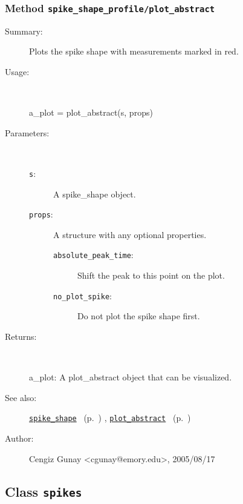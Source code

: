 \subsubsection[Method \texttt{plot\_abstract}]{Method \texttt{spike\_shape\_profile/plot\_abstract}}%
%
\label{ref_spike_shape_profile__plot_abstract}%
\hypertarget{ref_spike_shape_profile__plot_abstract}{}%
\begin{description}
\item[Summary:]Plots the spike shape with measurements marked in red.
%
\item[Usage:]~%
\begin{lyxcode}%
a\_plot = plot\_abstract(s, props)
%
\end{lyxcode}%
%
%
\item[Parameters:]~
\begin{description}%
\item[\texttt{s}:]
 A spike\_shape object.
\item[\texttt{props}:]
 A structure with any optional properties.
\begin{description}%
\item[\texttt{absolute\_peak\_time}:]
 Shift the peak to this point on the plot.
\item[\texttt{no\_plot\_spike}:]
 Do not plot the spike shape first.
\end{description}%
\end{description}%
%
\item[Returns:
]~

	a\_plot: A plot\_abstract object that can be visualized.
%
%
\item[See also:]%
\hyperlink{ref_spike_shape}{\texttt{spike\_shape}}%
\ (p.~\pageref{ref_spike_shape})%
%
, \hyperlink{ref_plot_abstract}{\texttt{plot\_abstract}}%
\ (p.~\pageref{ref_plot_abstract})%
%
%
\item[Author:]%
Cengiz Gunay <cgunay@emory.edu>, 2005/08/17
%
\end{description}
\methodline%
\subsection{Class \texttt{spikes}}%
%
\label{ref_spikes}%
\hypertarget{ref_spikes}{}%
